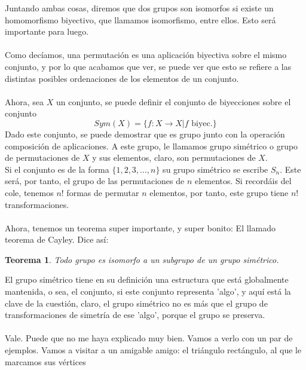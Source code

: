 \documentclass[12pt]{article}
\newtheorem{teo}{Teorema}
\begin{document}
Juntando ambas cosas, diremos que dos grupos son isomorfos si existe un homomorfismo biyectivo, que llamamos isomorfismo, entre ellos. Esto será importante para luego. \\\\
Como decíamos, una permutación es una aplicación biyectiva sobre el mismo conjunto, y por lo que acabamos que ver, se puede ver que esto se refiere a las distintas posibles ordenaciones de los elementos de un conjunto. \\\\ 
Ahora, sea $X$ un conjunto, se puede definir el conjunto de biyecciones sobre el conjunto
\begin{equation}
    Sym(X)=\{f: X\rightarrow X| f \text{ biyec.}\}
\end{equation}
Dado este conjunto, se puede demostrar que es grupo junto con la operación composición de aplicaciones. A este grupo, le llamamos grupo simétrico o grupo de permutaciones de $X$ y sus elementos, claro, son permutaciones de $X$. \\
Si el conjunto es de la forma $\{1,2,3,\dots, n\}$ su grupo simétrico se escribe $S_n$. Este será, por tanto, el grupo de las permutaciones de $n$ elementos. Si recordáis del cole, tenemos $n!$ formas de permutar $n$ elementos, por tanto, este grupo tiene $n!$ transformaciones. \\\\ Ahora, tenemos un teorema super importante, y super bonito: El llamado teorema de Cayley. Dice así:
\begin{teo}
    Todo grupo es isomorfo a un subgrupo de un grupo simétrico. 
\end{teo}
El grupo simétrico tiene en su definición una estructura que está globalmente mantenida, o sea, el conjunto, si este conjunto representa 'algo', y aquí está la clave de la cuestión, claro, el grupo simétrico no es más que el grupo de transformaciones de simetría de ese 'algo', porque el grupo se preserva.  %
\\\\ Vale. Puede que no me haya explicado muy bien. Vamos a verlo con un par de ejemplos. Vamos a visitar a un amigable amigo: el triángulo rectángulo, al que le marcamos sus vértices
\end{document}
